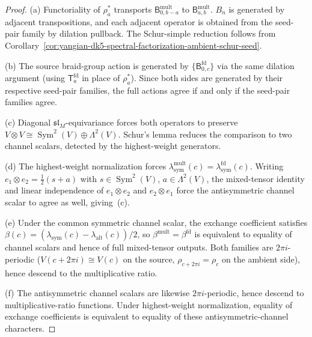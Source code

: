 \begin{proof}
\textup{(a)}
Functoriality of \(\rho_a^*\) transports
\(\mathsf B_{0,b-a}^{\mathrm{mult}}\) to
\(\mathsf B_{a,b}^{\mathrm{mult}}\).
\(B_n\) is generated by adjacent transpositions, and each adjacent
operator is obtained from the seed-pair family by dilation pullback.
The Schur-simple reduction follows from
Corollary~\ref{cor:yangian-dk5-spectral-factorization-ambient-schur-seed}.

\textup{(b)}
The source braid-group action is generated by
\(\{\mathsf B_{0,c}^{\mathrm{fd}}\}\) via the same dilation argument
(using \(\mathsf T_a^{\mathrm{fd}}\) in place of \(\rho_a^*\)).
Since both sides are generated by their respective seed-pair families,
the full actions agree if and only if the seed-pair families agree.

\textup{(c)}
Diagonal \(\mathfrak{sl}_M\)-equivariance forces both operators to
preserve
\(V\otimes V\cong \operatorname{Sym}^2(V)\oplus \Lambda^2(V)\).
Schur's lemma reduces the comparison to two channel scalars, detected
by the highest-weight generators.

\textup{(d)}
The highest-weight normalization forces
\(\lambda_{\mathrm{sym}}^{\mathrm{mult}}(c)=
\lambda_{\mathrm{sym}}^{\mathrm{fd}}(c)\).
Writing \(e_1\otimes e_2=\frac12(s+a)\) with
\(s\in\operatorname{Sym}^2(V)\), \(a\in\Lambda^2(V)\), the
mixed-tensor identity and linear independence of \(e_1\otimes e_2\)
and \(e_2\otimes e_1\) force the antisymmetric channel scalar to
agree as well, giving~\textup{(c)}.

\textup{(e)}
Under the common symmetric channel scalar, the exchange coefficient
satisfies
\(\beta(c)=(\lambda_{\mathrm{sym}}(c)-\lambda_{\mathrm{alt}}(c))/2\),
so \(\beta^{\mathrm{mult}}=\beta^{\mathrm{fd}}\) is equivalent to
equality of channel scalars and hence of full mixed-tensor outputs.
Both families are \(2\pi i\)-periodic (\(V(c+2\pi i)\cong V(c)\) on
the source, \(\rho_{c+2\pi i}=\rho_c\) on the ambient side), hence
descend to the multiplicative ratio.

\textup{(f)}
The antisymmetric channel scalars are likewise \(2\pi i\)-periodic,
hence descend to multiplicative-ratio functions. Under highest-weight
normalization, equality of exchange coefficients is equivalent to
equality of these antisymmetric-channel characters.
\end{proof}

